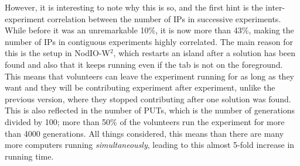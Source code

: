\documentclass[journal,onecolumn]{IEEEtran}
\begin{document}
However, it is interesting to note why this is so, and the first hint
is the inter-experiment correlation between the number of IPs in
successive experiments. While before it was an unremarkable 10\%, it is
now more than 43\%, making the number of IPs in contiguous experiments
highly correlated. The main reason for this is the setup in {\sf
  NodIO-W$^2$}, which restarts an island after a solution has been
found and also that it keeps running even if the tab is not on the
foreground. This means that volunteers can leave the experiment
running for as long as they want and they will be contributing 
experiment after experiment, unlike the previous version, where they
stopped contributing after one solution was found. This is also
reflected in the number of PUTs, which is the number of generations
divided by 100; more than 50\% of the volunteers run the experiment for more than
4000 generations. All things considered, this means than there are
many more computers running {\em simultaneously}, leading to this
almost 5-fold increase in running time.
\end{document}
